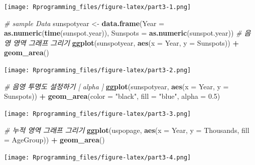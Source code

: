\documentclass[10pt,]{krantz}
\makeatletter
\newenvironment{Shaded}{\begin{snugshade}}{\end{snugshade}}
\newcommand{\KeywordTok}[1]{\textcolor[rgb]{0.13,0.29,0.53}{\textbf{#1}}}
\newcommand{\DataTypeTok}[1]{\textcolor[rgb]{0.13,0.29,0.53}{#1}}
\newcommand{\FloatTok}[1]{\textcolor[rgb]{0.00,0.00,0.81}{#1}}
\newcommand{\StringTok}[1]{\textcolor[rgb]{0.31,0.60,0.02}{#1}}
\newcommand{\CommentTok}[1]{\textcolor[rgb]{0.56,0.35,0.01}{\textit{#1}}}
\newcommand{\OperatorTok}[1]{\textcolor[rgb]{0.81,0.36,0.00}{\textbf{#1}}}
\newcommand{\NormalTok}[1]{#1}
\newenvironment{kframe}{%
\medskip{}
\setlength{\fboxsep}{.8em}
 \def\at@end@of@kframe{}%
 \ifinner\ifhmode%
  \def\at@end@of@kframe{\end{minipage}}%
  \begin{minipage}{\columnwidth}%
 \fi\fi%
 \def\FrameCommand##1{\hskip\@totalleftmargin \hskip-\fboxsep
 \colorbox{shadecolor}{##1}\hskip-\fboxsep
     \hskip-\linewidth \hskip-\@totalleftmargin \hskip\columnwidth}%
 \MakeFramed {\advance\hsize-\width
   \@totalleftmargin\z@ \linewidth\hsize
   \@setminipage}}%
 {\par\unskip\endMakeFramed%
 \at@end@of@kframe}
\renewenvironment{Shaded}{\begin{kframe}}{\end{kframe}}
\theoremstyle{definition}
\theoremstyle{definition}
\theoremstyle{remark}
\makeatother
\begin{document}
\texttt{[image: Rprogramming\_files/figure-latex/part3-1.png]}

\begin{Shaded}
\begin{Highlighting}[]


\CommentTok{# sample Data}
\NormalTok{sunspotyear <-}\StringTok{ }\KeywordTok{data.frame}\NormalTok{(}\DataTypeTok{Year     =} \KeywordTok{as.numeric}\NormalTok{(}\KeywordTok{time}\NormalTok{(sunspot.year)),}
                          \DataTypeTok{Sunspots =} \KeywordTok{as.numeric}\NormalTok{(sunspot.year))}
\CommentTok{# 음영 영역 그래프 그리기}
\KeywordTok{ggplot}\NormalTok{(sunspotyear, }\KeywordTok{aes}\NormalTok{(}\DataTypeTok{x =}\NormalTok{ Year, }\DataTypeTok{y =}\NormalTok{ Sunspots)) }\OperatorTok{+}\StringTok{ }\KeywordTok{geom_area}\NormalTok{()}
\end{Highlighting}
\end{Shaded}

\texttt{[image: Rprogramming\_files/figure-latex/part3-2.png]}

\begin{Shaded}
\begin{Highlighting}[]


\CommentTok{# 음영 투명도 설정하기 [ alpha ]}
\KeywordTok{ggplot}\NormalTok{(sunspotyear, }\KeywordTok{aes}\NormalTok{(}\DataTypeTok{x =}\NormalTok{ Year, }\DataTypeTok{y =}\NormalTok{ Sunspots)) }\OperatorTok{+}\StringTok{ }\KeywordTok{geom_area}\NormalTok{(}\DataTypeTok{color =} \StringTok{"black"}\NormalTok{, }\DataTypeTok{fill =} \StringTok{"blue"}\NormalTok{, }\DataTypeTok{alpha =} \FloatTok{0.5}\NormalTok{)}
\end{Highlighting}
\end{Shaded}

\texttt{[image: Rprogramming\_files/figure-latex/part3-3.png]}

\begin{Shaded}
\begin{Highlighting}[]


\CommentTok{# 누적 영역 그래프 그리기}
\KeywordTok{ggplot}\NormalTok{(uspopage, }\KeywordTok{aes}\NormalTok{(}\DataTypeTok{x =}\NormalTok{ Year, }\DataTypeTok{y =}\NormalTok{ Thousands, }\DataTypeTok{fill =}\NormalTok{ AgeGroup)) }\OperatorTok{+}\StringTok{ }\KeywordTok{geom_area}\NormalTok{()}
\end{Highlighting}
\end{Shaded}

\texttt{[image: Rprogramming\_files/figure-latex/part3-4.png]}
\end{document}
